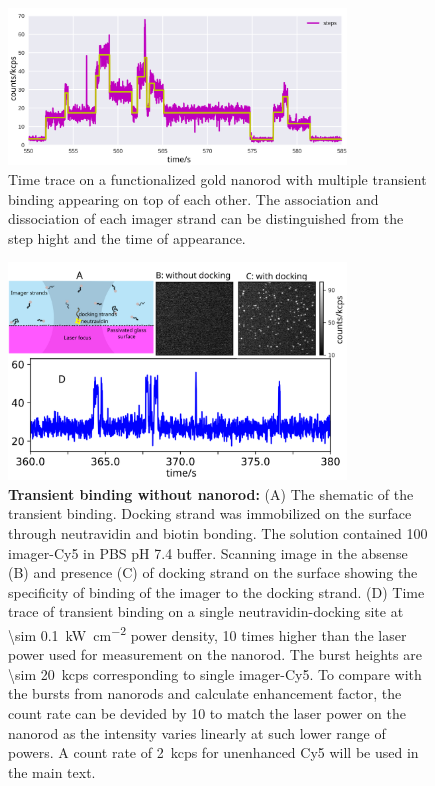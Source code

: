 \begin{figure}[ht]
  \centering
  \includegraphics[width=0.8\textwidth]{step_timetrace}
  \makeatletter
  \renewcommand{\fnum@figure}{\figurename~S\thefigure}
  \makeatother
  \caption{Time trace on a functionalized gold nanorod with multiple transient binding appearing on top of each other.
  The association and dissociation of each imager strand can be distinguished from the step hight and the time of appearance. }
  \label{SIfig: step_transbind}
\end{figure}
\begin{figure}[ht]
  \centering
  \includegraphics[width=0.8\textwidth]{timetrace_only_Cy5}
  \makeatletter
  \renewcommand{\fnum@figure}{\figurename~S\thefigure}
  \makeatother
  \caption{\textbf{Transient binding without nanorod:} (A) The shematic of the transient binding.
  Docking strand was immobilized on the surface through neutravidin and biotin bonding.
  The solution contained \SI{100}{\nM} imager-Cy5 in PBS pH 7.4 buffer.
  Scanning image  in the absense (B) and presence (C) of docking strand on the surface showing the specificity of binding of the imager to the docking strand.
  (D) Time trace of transient binding on a single neutravidin-docking site at \SI{\sim 0.1}{\kW\per\cm\squared} power density, 10 times higher than the laser power used for measurement on the nanorod. The burst heights are \SI{\sim 20}{ kcps} corresponding to single imager-Cy5.
  To compare with the bursts from nanorods and calculate enhancement factor, the count rate can be devided by 10 to match the laser power on the nanorod as the intensity varies linearly at such lower range of powers.
  A count rate of \SI{2}{ kcps} for unenhanced Cy5 will be used in the main text. 
  }
  \label{SIfig:timetrace_only_Cy5}
\end{figure}
